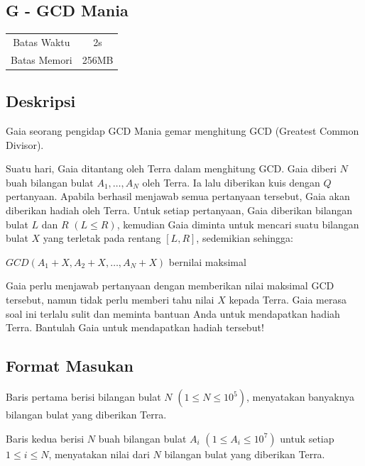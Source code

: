 \documentclass{article}
\begin{document}
\begin{center}
    \section*{G - GCD Mania} %

    \begin{tabular}{ | c c | }
        \hline
        Batas Waktu  & 2s \\    %
        Batas Memori & 256MB \\  %
        \hline
    \end{tabular}
\end{center}

\subsection*{Deskripsi}
Gaia seorang pengidap GCD Mania gemar menghitung GCD (Greatest Common Divisor).

Suatu hari, Gaia ditantang oleh Terra dalam menghitung GCD. Gaia diberi $N$ buah bilangan bulat $A_1, \dots, A_N$ oleh Terra. Ia lalu diberikan kuis dengan $Q$ pertanyaan. Apabila berhasil menjawab semua pertanyaan tersebut, Gaia akan diberikan hadiah oleh Terra. Untuk setiap pertanyaan, Gaia diberikan bilangan bulat $L$ dan $R$ $(L \leq R)$, kemudian Gaia diminta untuk mencari suatu bilangan bulat $X$ yang terletak pada rentang $[L, R]$, sedemikian sehingga:

\begin{center}
$GCD(A_1 + X, A_2 + X, \dots, A_N + X)$ bernilai maksimal
\end{center} 

Gaia perlu menjawab pertanyaan dengan memberikan nilai maksimal GCD tersebut, namun tidak perlu memberi tahu nilai $X$ kepada Terra. Gaia merasa soal ini terlalu sulit dan meminta bantuan Anda untuk mendapatkan hadiah Terra. Bantulah Gaia untuk mendapatkan hadiah tersebut!

\subsection*{Format Masukan}
Baris pertama berisi bilangan bulat $N$ $(1 \leq N \leq 10^5)$, menyatakan banyaknya bilangan bulat yang diberikan Terra.

Baris kedua berisi $N$ buah bilangan bulat $A_i$ $(1 \leq A_i \leq 10^7)$ untuk setiap $1 \leq i \leq N$, menyatakan nilai dari $N$ bilangan bulat yang diberikan Terra.
\end{document}
